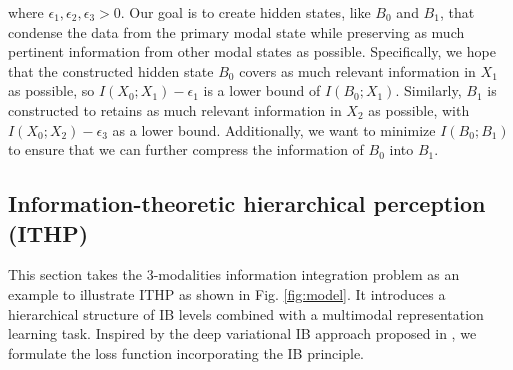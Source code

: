 \documentclass{article} %
\begin{document}
\noindent  
where $\epsilon_1, \epsilon_2, \epsilon_3 > 0$. Our goal is to create hidden states, like ${B}_{0}$ and ${B}_{1}$, that condense the data from the primary modal state while preserving as much pertinent information from other modal states as possible. %
Specifically, we hope that the constructed hidden state ${B}_{0}$ covers as much relevant information in ${X}_{1}$ as possible, so $I(X_{0};X_{1})-\epsilon_1$ is a lower bound of $I(B_{0};X_{1})$. Similarly, ${B}_{1}$ is constructed to retains as much relevant information in ${X}_{2}$ as possible, with $I(X_{0};X_{2})-\epsilon_3$ as a lower bound. Additionally, we want to minimize $I(B_{0};B_{1})$ to ensure that we can further compress the information of ${B}_{0}$ into ${B}_{1}$.



\subsection{Information-theoretic hierarchical perception (ITHP)}
\label{sec:learnCompactPer}

This section takes the 3-modalities information integration problem as an example to illustrate ITHP as shown in Fig. \ref{fig:model}. It introduces a hierarchical structure of IB levels combined with a multimodal representation learning task. Inspired by the deep variational IB approach proposed in \citet{lee2021variational}, we formulate the loss function incorporating the IB principle. %
\end{document}
